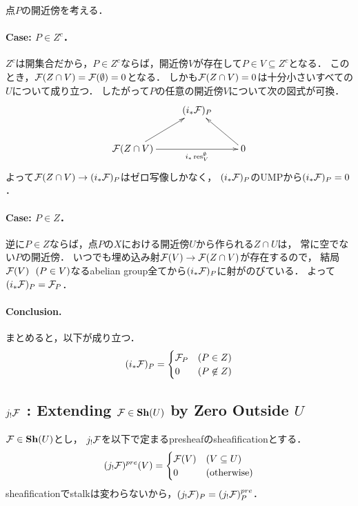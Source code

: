 \documentclass[a4paper]{jsarticle}
\newcommand{\Sh}{\mathbf{Sh}}
\begin{document}
    点$P$の開近傍を考える．

    \paragraph{Case: $P \in Z^c$．}
    $Z^c$は開集合だから，$P \in Z^c$ならば，開近傍$V$が存在して$P \in V \subseteq Z^c$となる．
    このとき，$\mathcal{F}(Z \cap V)=\mathcal{F}(\emptyset)=0$となる．
    しかも$\mathcal{F}(Z \cap V)=0$は十分小さいすべての$U$について成り立つ．
    したがって$P$の任意の開近傍$V$について次の図式が可換．
    \[
    \xymatrix
    {
        {} & (i_* \shF)_P & {} \\
        \shF(Z \cap V) \ar[rr]_-{i_* \res_{V}^{\emptyset}} \ar[ur]& {} & 0 \ar[ul]\\
    }
    \]
    よって$\mathcal{F}(Z \cap V) \to (i_* \mathcal{F})_P$はゼロ写像しかなく，
    $(i_* \mathcal{F})_P$のUMPから$(i_* \mathcal{F})_P=0$．

    \paragraph{Case: $P \in Z$．}
    逆に$P \in Z$ならば，点$P$の$X$における開近傍$U$から作られる$Z \cap U$は，
    常に空でない$P$の開近傍．
    いつでも埋め込み射$\mathcal{F}(V) \to \mathcal{F}(Z \cap V)$が存在するので，
    結局$\mathcal{F}(V) ~~(P \in V)$なるabelian group全てから$(i_* \mathcal{F})_P$に射がのびている．
    よって$(i_* \mathcal{F})_P=\mathcal{F}_P$．

    \paragraph{Conclusion.}
    まとめると，以下が成り立つ．
    \[
        (i_* \mathcal{F})_P=
        \begin{cases}{}
            \mathcal{F}_P & (P \in Z) \\
            0 & (P \not \in Z)
        \end{cases}
    \]

    \subsection{$j_! \mathcal{F}$ : Extending $\shF \in \Sh(U)$ by Zero Outside $U$}
    $\shF \in \Sh(U)$とし，
    $j_! \mathcal{F}$を以下で定まるpresheafのsheafificationとする．
    \[
        (j_! \mathcal{F})^{pre}(V)=
        \begin{cases}{}
            \mathcal{F}(V) & (V \subseteq U) \\
            0 & (\text{otherwise})
        \end{cases}
    \]
    sheafificationでstalkは変わらないから，$(j_! \mathcal{F})_P=(j_! \mathcal{F})^{pre}_P$．
\end{document}
